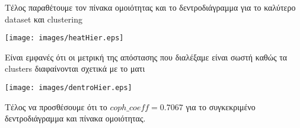 Τέλος παραθέτουμε τον πίνακα ομοιότητας και το δεντροδιάγραμμα για το καλύτερο dataset και clustering

\noindent\begin{minipage}{\linewidth}
    \centering
    \texttt{[image: images/heatHier.eps]}
    \label{fig:Heat}
\end{minipage}

Είναι εμφανές ότι οι μετρική της απόστασης που διαλέξαμε είναι σωστή
καθώς τα clusters διαφαίνονται σχετικά με το ματι

\noindent\begin{minipage}{\linewidth}
    \centering
    \texttt{[image: images/dentroHier.eps]}
    \label{fig:Dentro}
\end{minipage}

Τέλος να προσθέσουμε ότι το $coph\_coeff = 0.7067$ για το συγκεκριμένο δεντροδιάγραμμα και πίνακα ομοιότητας.
